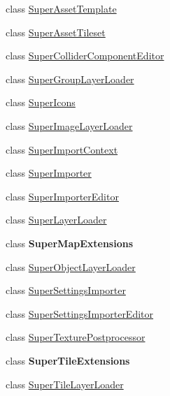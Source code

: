 \begin{DoxyCompactItemize}
\item 
class \mbox{\hyperlink{class_super_tiled2_unity_1_1_editor_1_1_super_asset_template}{Super\+Asset\+Template}}
\item 
class \mbox{\hyperlink{class_super_tiled2_unity_1_1_editor_1_1_super_asset_tileset}{Super\+Asset\+Tileset}}
\item 
class \mbox{\hyperlink{class_super_tiled2_unity_1_1_editor_1_1_super_collider_component_editor}{Super\+Collider\+Component\+Editor}}
\item 
class \mbox{\hyperlink{class_super_tiled2_unity_1_1_editor_1_1_super_group_layer_loader}{Super\+Group\+Layer\+Loader}}
\item 
class \mbox{\hyperlink{class_super_tiled2_unity_1_1_editor_1_1_super_icons}{Super\+Icons}}
\item 
class \mbox{\hyperlink{class_super_tiled2_unity_1_1_editor_1_1_super_image_layer_loader}{Super\+Image\+Layer\+Loader}}
\item 
class \mbox{\hyperlink{class_super_tiled2_unity_1_1_editor_1_1_super_import_context}{Super\+Import\+Context}}
\item 
class \mbox{\hyperlink{class_super_tiled2_unity_1_1_editor_1_1_super_importer}{Super\+Importer}}
\item 
class \mbox{\hyperlink{class_super_tiled2_unity_1_1_editor_1_1_super_importer_editor}{Super\+Importer\+Editor}}
\item 
class \mbox{\hyperlink{class_super_tiled2_unity_1_1_editor_1_1_super_layer_loader}{Super\+Layer\+Loader}}
\item 
class {\bfseries Super\+Map\+Extensions}
\item 
class \mbox{\hyperlink{class_super_tiled2_unity_1_1_editor_1_1_super_object_layer_loader}{Super\+Object\+Layer\+Loader}}
\item 
class \mbox{\hyperlink{class_super_tiled2_unity_1_1_editor_1_1_super_settings_importer}{Super\+Settings\+Importer}}
\item 
class \mbox{\hyperlink{class_super_tiled2_unity_1_1_editor_1_1_super_settings_importer_editor}{Super\+Settings\+Importer\+Editor}}
\item 
class \mbox{\hyperlink{class_super_tiled2_unity_1_1_editor_1_1_super_texture_postprocessor}{Super\+Texture\+Postprocessor}}
\item 
class {\bfseries Super\+Tile\+Extensions}
\item 
class \mbox{\hyperlink{class_super_tiled2_unity_1_1_editor_1_1_super_tile_layer_loader}{Super\+Tile\+Layer\+Loader}}
\item 

\end{DoxyCompactItemize}
